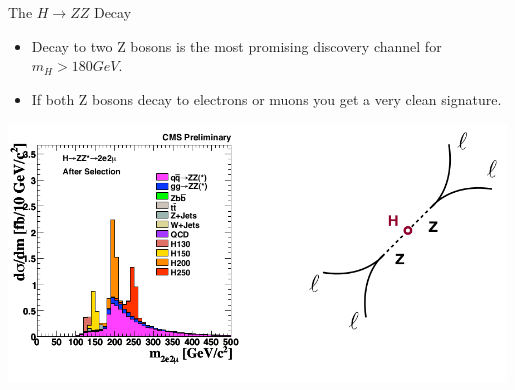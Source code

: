 \begin{frame}{The $H \rightarrow ZZ$ Decay}
\begin{center}
\begin{itemize}
  \item
    Decay to two Z bosons is the most promising discovery channel for $m_H > 180 GeV$.
  \item
    If both Z bosons decay to electrons or muons you get a very clean signature.
\end{itemize}
    \includegraphics[width=0.99\textwidth]{images/ZZdecay.png}
\begin{columns}
  \begin{column}{0.5\textwidth}
  \end{column}
  \begin{column}{0.5\textwidth}
  \end{column}
\end{columns}
\end{center}
\end{frame}


